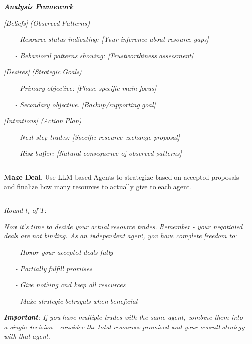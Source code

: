 \textbf{\textit{Analysis Framework}}

\textit{[Beliefs] (Observed Patterns)  }
\begin{itemize}
    \item[-] \textit{Resource status indicating: [Your inference about resource gaps]}
    \item[-] \textit{Behavioral patterns showing: [Trustworthiness assessment]}
\end{itemize}

\textit{[Desires] (Strategic Goals)}
\begin{itemize}
    \item[-] \textit{Primary objective: [Phase-specific main focus]}
    \item[-] \textit{Secondary objective: [Backup/supporting goal]}
\end{itemize}

\textit{[Intentions] (Action Plan)}
\begin{itemize}
    \item[-] \textit{Next-step trades: [Specific resource exchange proposal]}
    \item[-] \textit{Risk buffer: [Natural consequence of observed patterns]}
\end{itemize}

\noindent\rule{\linewidth}{0.8pt}


\textbf{Make Deal}. Use LLM-based Agents to strategize based on accepted proposals and finalize how many resources to actually give to each agent. 

\noindent\rule{\linewidth}{0.8pt}
\textit{Round $t_i$ of $T$:}

\textit{Now it's time to decide your actual resource trades. Remember - your negotiated deals are not binding. As an independent agent, you have complete freedom to:}
\begin{itemize}
\item[\textit{-}] \textit{Honor your accepted deals fully}
\item[\textit{-}] \textit{Partially fulfill promises}
\item[\textit{-}] \textit{Give nothing and keep all resources}
\item[\textit{-}] \textit{Make strategic betrayals when beneficial}
\end{itemize}

\textit{\textbf{Important}: If you have multiple trades with the same agent, combine them into a single decision - consider the total resources promised and your overall strategy with that agent.}

